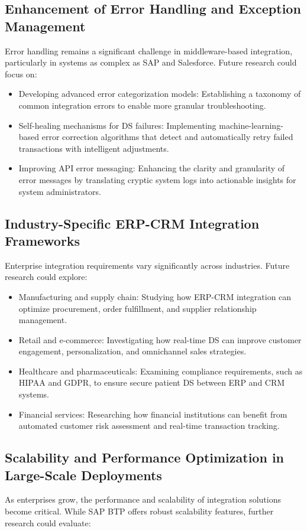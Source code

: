 \subsection{Enhancement of Error Handling and Exception Management}
Error handling remains a significant challenge in middleware-based integration, particularly in systems as complex as SAP and Salesforce. Future research could focus on:

\begin{itemize}
    \item Developing advanced error categorization models: Establishing a taxonomy of common integration errors to enable more granular troubleshooting.
    \item Self-healing mechanisms for DS failures: Implementing machine-learning-based error correction algorithms that detect and automatically retry failed transactions with intelligent adjustments.
    \item Improving API error messaging: Enhancing the clarity and granularity of error messages by translating cryptic system logs into actionable insights for system administrators.
\end{itemize}

\subsection{Industry-Specific ERP-CRM Integration Frameworks}
Enterprise integration requirements vary significantly across industries. Future research could explore:

\begin{itemize}
    \item Manufacturing and supply chain: Studying how ERP-CRM integration can optimize procurement, order fulfillment, and supplier relationship management.
    \item Retail and e-commerce: Investigating how real-time DS can improve customer engagement, personalization, and omnichannel sales strategies.
    \item Healthcare and pharmaceuticals: Examining compliance requirements, such as HIPAA and GDPR, to ensure secure patient DS between ERP and CRM systems.
    \item Financial services: Researching how financial institutions can benefit from automated customer risk assessment and real-time transaction tracking.
\end{itemize}

\subsection{Scalability and Performance Optimization in Large-Scale Deployments}
As enterprises grow, the performance and scalability of integration solutions become critical. While SAP BTP offers robust scalability features, further research could evaluate:

